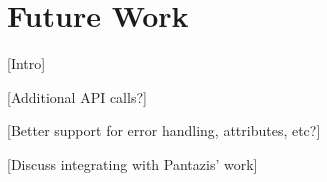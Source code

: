 \chapter{Future Work}\label{ch:futurework}
[Intro]

[Additional API calls?]

[Better support for error handling, attributes, etc?]

[Discuss integrating with Pantazis' work]


